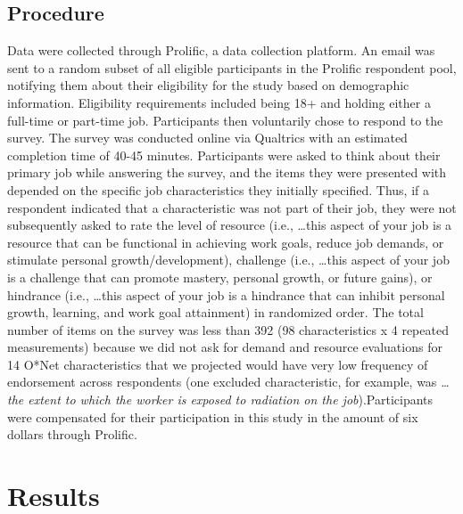 \documentclass[
  english,
  man]{apa6}
\begin{document}
\hypertarget{procedure}{%
\subsection{Procedure}\label{procedure}}

Data were collected through Prolific, a data collection platform. An email was sent to a random subset of all eligible participants in the Prolific respondent pool, notifying them about their eligibility for the study based on demographic information. Eligibility requirements included being 18+ and holding either a full-time or part-time job. Participants then voluntarily chose to respond to the survey. The survey was conducted online via Qualtrics with an estimated completion time of 40-45 minutes. Participants were asked to think about their primary job while answering the survey, and the items they were presented with depended on the specific job characteristics they initially specified. Thus, if a respondent indicated that a characteristic was not part of their job, they were not subsequently asked to rate the level of resource (i.e., \ldots this aspect of your job is a resource that can be functional in achieving work goals, reduce job demands, or stimulate personal growth/development), challenge (i.e., \ldots this aspect of your job is a challenge that can promote mastery, personal growth, or future gains), or hindrance (i.e., \ldots this aspect of your job is a hindrance that can inhibit personal growth, learning, and work goal attainment) in randomized order. The total number of items on the survey was less than 392 (98 characteristics x 4 repeated measurements) because we did not ask for demand and resource evaluations for 14 O*Net characteristics that we projected would have very low frequency of endorsement across respondents (one excluded characteristic, for example, was \emph{\ldots the extent to which the worker is exposed to radiation on the job}).Participants were compensated for their participation in this study in the amount of six dollars through Prolific.

\hypertarget{results}{%
\section{Results}\label{results}}
\end{document}
